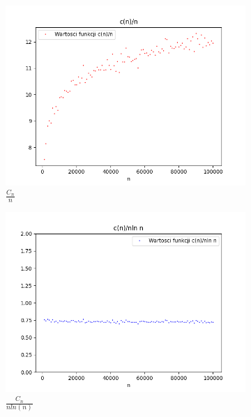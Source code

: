 \documentclass{report}
\begin{document}
    \begin{figure}[H]
        \centering
        \begin{subfigure}{.5\textwidth}
          \centering
          \includegraphics[width=1.1\linewidth]{plotcnfunc1.png}
          \caption{\( \frac{C_n}{n} \)}
          \label{fig:plotcnfunc1}
        \end{subfigure}%
        \begin{subfigure}{.5\textwidth}
          \centering
          \includegraphics[width=1.1\linewidth]{plotcnfunc2.png}
          \caption{\( \frac{C_n}{nln(n)} \)}
          \label{fig:plotcnfunc2}
        \end{subfigure}
        \begin{subfigure}{.5\textwidth}

\end{subfigure}
\end{figure}
\end{document}
